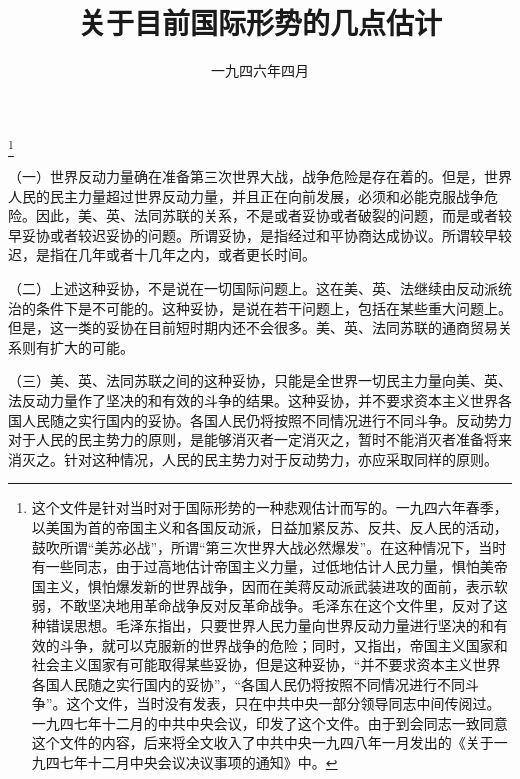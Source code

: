 
\title{关于目前国际形势的几点估计}
\date{一九四六年四月}
\thanks{这个文件是针对当时对于国际形势的一种悲观估计而写的。一九四六年春季，以美国为首的帝国主义和各国反动派，日益加紧反苏、反共、反人民的活动，鼓吹所谓“美苏必战”，所谓“第三次世界大战必然爆发”。在这种情况下，当时有一些同志，由于过高地估计帝国主义力量，过低地估计人民力量，惧怕美帝国主义，惧怕爆发新的世界战争，因而在美蒋反动派武装进攻的面前，表示软弱，不敢坚决地用革命战争反对反革命战争。毛泽东在这个文件里，反对了这种错误思想。毛泽东指出，只要世界人民力量向世界反动力量进行坚决的和有效的斗争，就可以克服新的世界战争的危险；同时，又指出，帝国主义国家和社会主义国家有可能取得某些妥协，但是这种妥协，“并不要求资本主义世界各国人民随之实行国内的妥协”，“各国人民仍将按照不同情况进行不同斗争”。这个文件，当时没有发表，只在中共中央一部分领导同志中间传阅过。一九四七年十二月的中共中央会议，印发了这个文件。由于到会同志一致同意这个文件的内容，后来将全文收入了中共中央一九四八年一月发出的《关于一九四七年十二月中央会议决议事项的通知》中。}
\maketitle


（一）世界反动力量确在准备第三次世界大战，战争危险是存在着的。但是，世界人民的民主力量超过世界反动力量，并且正在向前发展，必须和必能克服战争危险。因此，美、英、法同苏联的关系，不是或者妥协或者破裂的问题，而是或者较早妥协或者较迟妥协的问题。所谓妥协，是指经过和平协商达成协议。所谓较早较迟，是指在几年或者十几年之内，或者更长时间。

（二）上述这种妥协，不是说在一切国际问题上。这在美、英、法继续由反动派统治的条件下是不可能的。这种妥协，是说在若干问题上，包括在某些重大问题上。但是，这一类的妥协在目前短时期内还不会很多。美、英、法同苏联的通商贸易关系则有扩大的可能。

（三）美、英、法同苏联之间的这种妥协，只能是全世界一切民主力量向美、英、法反动力量作了坚决的和有效的斗争的结果。这种妥协，并不要求资本主义世界各国人民随之实行国内的妥协。各国人民仍将按照不同情况进行不同斗争。反动势力对于人民的民主势力的原则，是能够消灭者一定消灭之，暂时不能消灭者准备将来消灭之。针对这种情况，人民的民主势力对于反动势力，亦应采取同样的原则。
